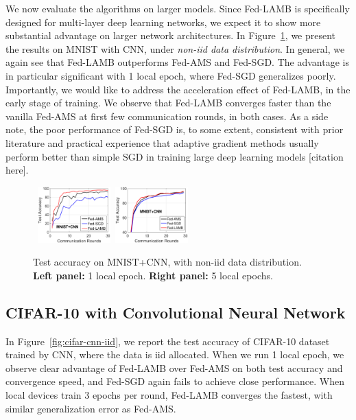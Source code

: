 \documentclass{article}
\begin{document}
We now evaluate the algorithms on larger models. Since Fed-LAMB is specifically designed for multi-layer deep learning networks, we expect it to show more substantial advantage on larger network architectures. In Figure~\ref{fig:mnist-cnn-noniid}, we present the results on MNIST with CNN, under \emph{non-iid data distribution}. In general, we again see that Fed-LAMB outperforms Fed-AMS and Fed-SGD. The advantage is in particular significant with 1 local epoch, where Fed-SGD generalizes poorly. Importantly, we would like to address the acceleration effect of Fed-LAMB, in the early stage of training. We observe that Fed-LAMB converges faster than the vanilla Fed-AMS at first few communication rounds, in both cases. As a side note, the poor performance of Fed-SGD is, to some extent, consistent with prior literature and practical experience that adaptive gradient methods usually perform better than simple SGD in training large deep learning models [citation here]. 


\begin{figure}[h]
    \begin{center}
        \mbox{
        \includegraphics[width=0.25\textwidth]{figure/mnist_testerror_cnn_ep1_client60_iid0.eps}
        \includegraphics[width=0.25\textwidth]{figure/mnist_testerror_cnn_ep5_client50_iid0.eps}
        }
    \end{center}
	\caption{Test accuracy on MNIST+CNN, with non-iid data distribution. \textbf{Left panel:} 1 local epoch. \textbf{Right panel:} 5 local epochs.}
	\label{fig:mnist-cnn-noniid}
\end{figure}


\subsection{CIFAR-10 with Convolutional Neural Network}

In Figure~\ref{fig:cifar-cnn-iid}, we report the test accuracy of CIFAR-10 dataset trained by CNN, where the data is iid allocated. When we run 1 local epoch, we observe clear advantage of Fed-LAMB over Fed-AMS on both test accuracy and convergence speed, and Fed-SGD again fails to achieve close performance. When local devices train 3 epochs per round, Fed-LAMB converges the fastest, with similar generalization error as Fed-AMS. 
\end{document}
